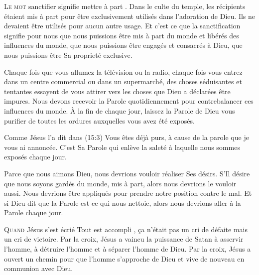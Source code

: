 \lettrine{L}{e mot} \Og sanctifier \Fg{} signifie \Og mettre à part \Fg{}.
 Dans le culte du temple, les récipients étaient mis à part pour être
 exclusivement utilisés dans l'adoration de Dieu.
 Ils ne devaient être utilisés pour aucun autre usage.
 Et c'est ce que la sanctification signifie pour nous
 \ocadr que nous puissions être mis à part du monde et libérés
 des influences du monde, que nous puissions être engagés et consacrés à Dieu,
 que nous puissions être Sa proprieté exclusive.


Chaque fois que vous allumez la télévision ou la radio,
 chaque fois vous entrez dans un centre commercial ou dans un supermarché,
 des choses séduisantes et tentantes essayent de vous attirer
 vers les choses que Dieu a déclarées être impures.
 Nous devons recevoir la Parole quotidiennement pour contrebalancer
 ces influences du monde. À la fin de chaque jour,
 laissez la Parole de Dieu vous purifier de toutes les ordures
 auxquelles vous avez été exposés.

Comme Jésus l'a dit dans (15:3)\frcolon{} 
 \Og Vous êtes déjà purs, à cause de la parole que je vous ai annoncée. \Fg{}
 C'est Sa Parole qui enlève la saleté à laquelle nous sommes exposés chaque jour.

Parce que nous aimons Dieu, nous devrions vouloir réaliser Ses désirs.
 S'Il désire que nous soyons gardés du monde, mis à part,
 alors nous devrions le vouloir aussi. Nous devrions être appliqués
 pour prendre notre position contre le mal.
 Et si Dieu dit que la Parole est ce qui nous nettoie,
 alors nous devrions aller à la Parole chaque jour.

\dvrule






\lettrine{Q}{uand} Jésus s'est écrié\frcolon{} 
 \Og Tout est accompli \Fg{}, \c{c}a n'était pas un cri de défaite
 mais un cri de victoire. Par la croix, Jésus a vaincu la puissance
 de Satan à asservir l'homme, à détruire l'homme et à séparer l'homme de Dieu.
 Par la croix, Jésus a ouvert un chemin pour que l'homme
 s'approche de Dieu et vive de nouveau en communion avec Dieu.

